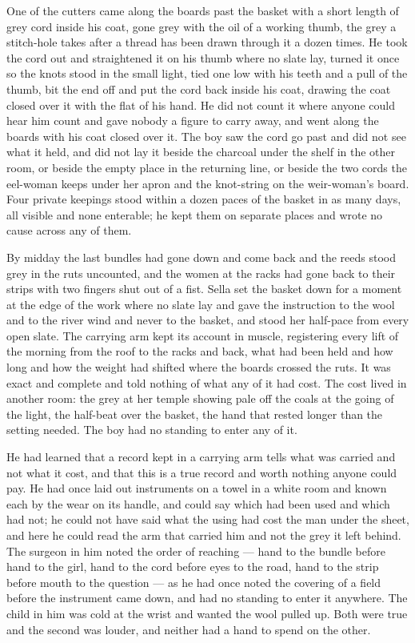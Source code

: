 One of the cutters came along the boards past the basket with a short length of grey cord inside his coat, gone grey with the oil of a working thumb, the grey a stitch-hole takes after a thread has been drawn through it a dozen times. He took the cord out and straightened it on his thumb where no slate lay, turned it once so the knots stood in the small light, tied one low with his teeth and a pull of the thumb, bit the end off and put the cord back inside his coat, drawing the coat closed over it with the flat of his hand. He did not count it where anyone could hear him count and gave nobody a figure to carry away, and went along the boards with his coat closed over it. The boy saw the cord go past and did not see what it held, and did not lay it beside the charcoal under the shelf in the other room, or beside the empty place in the returning line, or beside the two cords the eel-woman keeps under her apron and the knot-string on the weir-woman's board. Four private keepings stood within a dozen paces of the basket in as many days, all visible and none enterable; he kept them on separate places and wrote no cause across any of them.

\scenebreak

By midday the last bundles had gone down and come back and the reeds stood grey in the ruts uncounted, and the women at the racks had gone back to their strips with two fingers shut out of a fist. Sella set the basket down for a moment at the edge of the work where no slate lay and gave the instruction to the wool and to the river wind and never to the basket, and stood her half-pace from every open slate. The carrying arm kept its account in muscle, registering every lift of the morning from the roof to the racks and back, what had been held and how long and how the weight had shifted where the boards crossed the ruts. It was exact and complete and told nothing of what any of it had cost. The cost lived in another room: the grey at her temple showing pale off the coals at the going of the light, the half-beat over the basket, the hand that rested longer than the setting needed. The boy had no standing to enter any of it.

He had learned that a record kept in a carrying arm tells what was carried and not what it cost, and that this is a true record and worth nothing anyone could pay. He had once laid out instruments on a towel in a white room and known each by the wear on its handle, and could say which had been used and which had not; he could not have said what the using had cost the man under the sheet, and here he could read the arm that carried him and not the grey it left behind. The surgeon in him noted the order of reaching --- hand to the bundle before hand to the girl, hand to the cord before eyes to the road, hand to the strip before mouth to the question --- as he had once noted the covering of a field before the instrument came down, and had no standing to enter it anywhere. The child in him was cold at the wrist and wanted the wool pulled up. Both were true and the second was louder, and neither had a hand to spend on the other.

